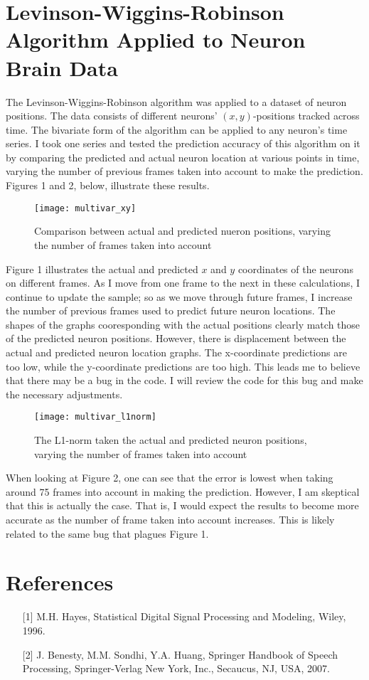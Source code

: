 \documentclass{article}
\begin{document}
\section{Levinson-Wiggins-Robinson Algorithm Applied to Neuron Brain Data}
The Levinson-Wiggins-Robinson algorithm was applied to a dataset of neuron positions.  The data consists of different neurons' $(x,y)$-positions tracked across time. The bivariate form of the algorithm can be applied to any neuron's time series. I took one series and tested the prediction accuracy of this algorithm on it by comparing the predicted and actual neuron location at various points in time, varying the number of previous frames taken into account to make the prediction.  Figures 1 and 2, below, illustrate these results.
\begin{figure}[H]
  \texttt{[image: multivar\_xy]}
  \caption{Comparison between actual and predicted nueron positions, varying the number of frames taken into account}
  \label{fig:MV_comp}
\end{figure}
Figure 1 illustrates the actual and predicted $x$ and $y$ coordinates of the neurons on different frames. As I move from one frame to the next in these calculations, I continue to update the sample; so as we move through future frames, I increase the number of previous frames used to predict future neuron locations. The shapes of the graphs cooresponding with the actual positions clearly match those of the predicted neuron positions. However, there is displacement between the actual and predicted neuron location graphs. The x-coordinate predictions are too low, while the y-coordinate predictions are too high. This leads me to believe that there may be a bug in the code. I will review the code for this bug and make the necessary adjustments.

\begin{figure}[H]
  \begin{center}
    \texttt{[image: multivar\_l1norm]}
  \end{center}
  \caption{The L1-norm taken the actual and predicted neuron positions, varying the number of frames taken into account}
  \label{fig:MV_dist}
\end{figure}
When looking at Figure 2, one can see that the error is lowest when taking around 75 frames into account in making the prediction. However, I am skeptical that this is actually the case.  That is, I would expect the results to become more accurate as the number of frame taken into account increases. This is likely related to the same bug that plagues Figure 1.

\section{References}
\begin{enumerate}
\item[{[1]}] M.H. Hayes, Statistical Digital Signal Processing and Modeling, Wiley, 1996.\\
\item[{[2]}] J. Benesty, M.M. Sondhi, Y.A. Huang, Springer Handbook of Speech Processing, Springer-Verlag New York, Inc., Secaucus, NJ, USA, 2007.
\end{enumerate}
\end{document}
